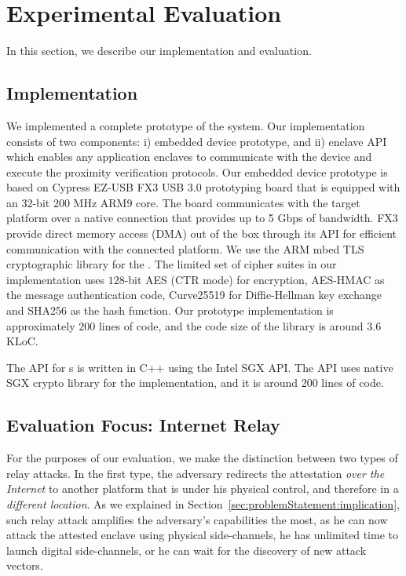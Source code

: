 
\section{Experimental Evaluation}
\label{sec:evaluation}

In this section, we describe our implementation and evaluation. 


\subsection{Implementation}
\label{sec:evaluation:implementation}

We implemented a complete prototype of the \name system. Our implementation consists of two components: i) \device embedded device prototype, and ii) \name enclave API which enables any application enclaves to communicate with the \device device and execute the proximity verification protocols.
\parasaver
{} Our embedded device prototype is based on Cypress EZ-USB FX3 USB 3.0 prototyping board that is equipped with an $32$-bit $200$ MHz ARM9 core. The board communicates with the target platform over a native  connection that provides up to 5 Gbps of bandwidth. FX3 provide direct memory access (DMA) out of the box through its API for efficient communication with the connected platform. We use the ARM mbed TLS~\cite{mbed} cryptographic library for the \tls. The limited set of cipher suites in our implementation uses $128$-bit AES (CTR mode) for encryption, AES-HMAC as the message authentication code,  Curve25519 for Diffie-Hellman key exchange and SHA256 as the hash function. Our prototype implementation is approximately $200$ lines of code, and the code size of the \tls library is around $3.6$ KLoC.

\parasaver
{} 
The \name API for \app{}s is written in C++ using the Intel SGX API. The API uses native SGX crypto library for the \tls implementation, and it is around 200 lines of code.


\subsection{Evaluation Focus: Internet Relay}
\label{sec:evaluation:focus}

For the purposes of our evaluation, we make the distinction between two types of relay attacks. In the first type, the adversary redirects the attestation \emph{over the Internet} to another platform that is under his physical control, and therefore in a \emph{different location}. As we explained in Section~\ref{sec:problemStatement:implication}, such relay attack amplifies the adversary's capabilities the most, as he can now attack the attested enclave using physical side-channels, he has unlimited time to launch digital side-channels, or he can wait for the discovery of new attack vectors. 

